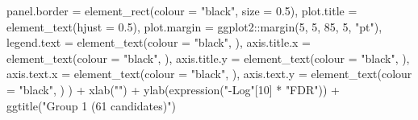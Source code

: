 \documentclass[
  11pt,
  oneside]{book}
\newenvironment{Shaded}{\begin{snugshade}}{\end{snugshade}}
\newcommand{\AttributeTok}[1]{\textcolor[rgb]{0.77,0.63,0.00}{#1}}
\newcommand{\DecValTok}[1]{\textcolor[rgb]{0.00,0.00,0.81}{#1}}
\newcommand{\FloatTok}[1]{\textcolor[rgb]{0.00,0.00,0.81}{#1}}
\newcommand{\FunctionTok}[1]{\textcolor[rgb]{0.00,0.00,0.00}{#1}}
\newcommand{\NormalTok}[1]{#1}
\newcommand{\SpecialCharTok}[1]{\textcolor[rgb]{0.00,0.00,0.00}{#1}}
\newcommand{\StringTok}[1]{\textcolor[rgb]{0.31,0.60,0.02}{#1}}
\begin{document}
\begin{Shaded}
\begin{Highlighting}[]
    \AttributeTok{panel.border =} \FunctionTok{element\_rect}\NormalTok{(}\AttributeTok{colour =} \StringTok{"black"}\NormalTok{, }\AttributeTok{size =} \FloatTok{0.5}\NormalTok{),}
    \AttributeTok{plot.title =} \FunctionTok{element\_text}\NormalTok{(}\AttributeTok{hjust =} \FloatTok{0.5}\NormalTok{),}
    \AttributeTok{plot.margin =}\NormalTok{ ggplot2}\SpecialCharTok{::}\FunctionTok{margin}\NormalTok{(}\DecValTok{5}\NormalTok{, }\DecValTok{5}\NormalTok{, }\DecValTok{85}\NormalTok{, }\DecValTok{5}\NormalTok{, }\StringTok{"pt"}\NormalTok{),}
    \AttributeTok{legend.text =} \FunctionTok{element\_text}\NormalTok{(}\AttributeTok{colour =} \StringTok{"black"}\NormalTok{, ),}
    \AttributeTok{axis.title.x =} \FunctionTok{element\_text}\NormalTok{(}\AttributeTok{colour =} \StringTok{"black"}\NormalTok{, ),}
    \AttributeTok{axis.title.y =} \FunctionTok{element\_text}\NormalTok{(}\AttributeTok{colour =} \StringTok{"black"}\NormalTok{, ),}
    \AttributeTok{axis.text.x =} \FunctionTok{element\_text}\NormalTok{(}\AttributeTok{colour =} \StringTok{"black"}\NormalTok{, ),}
    \AttributeTok{axis.text.y =} \FunctionTok{element\_text}\NormalTok{(}\AttributeTok{colour =} \StringTok{"black"}\NormalTok{, )}
\NormalTok{  ) }\SpecialCharTok{+}
  \FunctionTok{xlab}\NormalTok{(}\StringTok{""}\NormalTok{) }\SpecialCharTok{+}
  \FunctionTok{ylab}\NormalTok{(}\FunctionTok{expression}\NormalTok{(}\StringTok{"{-}Log"}\NormalTok{[}\DecValTok{10}\NormalTok{] }\SpecialCharTok{*} \StringTok{"FDR"}\NormalTok{)) }\SpecialCharTok{+}
  \FunctionTok{ggtitle}\NormalTok{(}\StringTok{"Group 1 (61 candidates)"}\NormalTok{)}
\end{Highlighting}
\end{Shaded}
\end{document}
